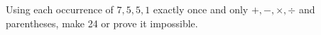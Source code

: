 Using each occurrence of $7,5,5,1$ exactly once and only $+,-,\times,\div$ and parentheses, make 24 or prove it impossible.
